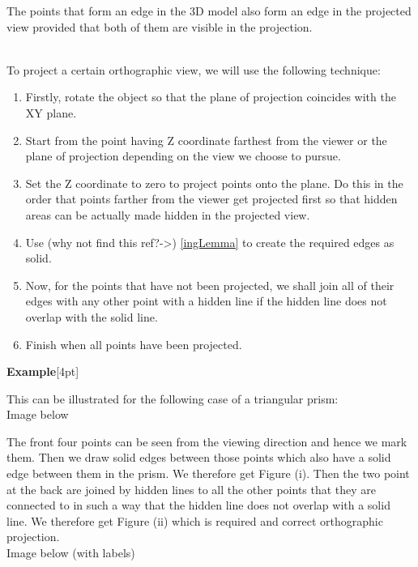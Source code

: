 \documentclass[12pt]{report}
\begin{document}
\begin{lemma}
  \label{ingLemma}
  The points that form an edge in the 3D model also form an edge in the projected view provided that both of them are visible in the projection.
\end{lemma}
\\
\vspace{0.2cm}
To project a certain orthographic view, we will use the following technique:
\\
\begin{enumerate}
  \item 
  Firstly, rotate the object so that the plane of projection coincides with the XY plane. 
  \item 
  Start from the point having Z coordinate farthest from the viewer or the plane of projection depending on the view we choose to pursue. 
  \item 
  Set the Z coordinate to zero to project points onto the plane. Do this in the order that points farther from the viewer get projected first so that hidden areas can be actually made hidden in the projected view. 
  \item 
  Use (why not find this ref?->) \ref{ingLemma} to create the required edges as solid. 
  \item 
  Now, for the points that have not been projected, we shall join all of their edges with any other point with a hidden line if the hidden line does not overlap with the solid line.
  \item 
  Finish when all points have been projected. 
  
\end{enumerate}


\textbf{Example}[4pt]

This can be illustrated for the following case of a triangular prism:\\
Image below\\
\vspace{6cm}

The front four points can be seen from the viewing direction and hence we mark them. Then we draw solid edges between those points which also have a solid edge between them in the prism. We therefore get	Figure (i). Then the two point at the back are joined by hidden lines to all the other points that they are connected to in such a way that the hidden line does not overlap with a solid line. We therefore get Figure (ii) which is required and correct orthographic projection.
\\
Image below (with labels) \\
\vspace{4cm}
\end{document}
